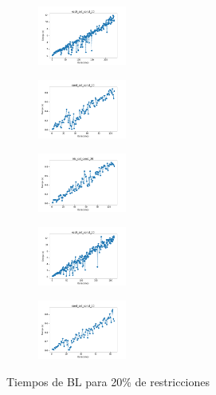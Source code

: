 \begin{figure}[H]
\begin{subfigure}
    \end{subfigure}
    \hfill
    \begin{subfigure}
        \centering
        \includegraphics[width=0.32\textwidth]{img/bl/ecoli_set_const_20_49258669_time.png}
    \end{subfigure}
    \hfill
    \begin{subfigure}
        \centering
        \includegraphics[width=0.32\textwidth]{img/bl/rand_set_const_20_49258669_time.png}
    \end{subfigure}
    \hfill
    \begin{subfigure}
        \centering
        \includegraphics[width=0.32\textwidth]{img/bl/iris_set_const_20_3773969821_time.png}
    \end{subfigure}
    \hfill
    \begin{subfigure}
        \centering
        \includegraphics[width=0.32\textwidth]{img/bl/ecoli_set_const_20_3773969821_time.png}
    \end{subfigure}
    \hfill
    \begin{subfigure}
        \centering
        \includegraphics[width=0.32\textwidth]{img/bl/rand_set_const_20_3773969821_time.png}
    \end{subfigure}
    \caption{Tiempos de BL para 20\% de restricciones}
\end{figure}

